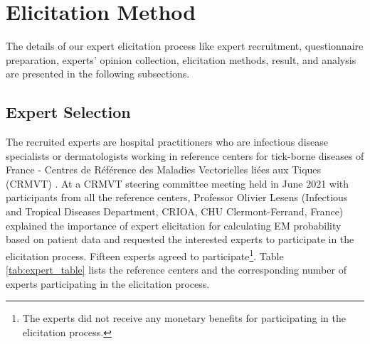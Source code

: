 \section{Elicitation Method}\label{sec:elicitation}
The details of our expert elicitation process like expert recruitment, questionnaire preparation, experts’ opinion collection, elicitation methods, result, and analysis are presented in the following subsections.

\subsection{Expert Selection}
The recruited experts are hospital practitioners who are infectious disease specialists or dermatologists working in reference centers for tick-borne diseases of France - Centres de Référence des Maladies Vectorielles liées aux Tiques (CRMVT) \cite{CRMVTRef}. At a CRMVT steering committee meeting held in June 2021 with participants from all the reference centers, Professor Olivier Lesens (Infectious and Tropical Diseases Department, CRIOA, CHU Clermont-Ferrand, France) explained the importance of expert elicitation for calculating EM probability based on patient data and requested the interested experts to participate in the elicitation process. Fifteen experts agreed to participate\footnote{The experts did not receive any monetary benefits for participating in the elicitation process.}. Table \ref{tab:expert_table} lists the reference centers and the corresponding number of experts participating in the elicitation process.
